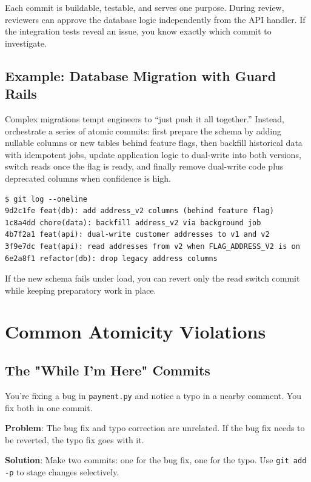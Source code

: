 Each commit is buildable, testable, and serves one purpose. During review, reviewers can approve the database logic independently from the API handler. If the integration tests reveal an issue, you know exactly which commit to investigate.

\subsection{Example: Database Migration with Guard Rails}
Complex migrations tempt engineers to ``just push it all together.'' Instead, orchestrate a series of atomic commits: first prepare the schema by adding nullable columns or new tables behind feature flags, then backfill historical data with idempotent jobs, update application logic to dual-write into both versions, switch reads once the flag is ready, and finally remove dual-write code plus deprecated columns when confidence is high.

\begin{lstlisting}[style=shell,caption={Sequencing migration commits}]
$ git log --oneline
9d2c1fe feat(db): add address_v2 columns (behind feature flag)
1c8a4dd chore(data): backfill address_v2 via background job
4b7f2a1 feat(api): dual-write customer addresses to v1 and v2
3f9e7dc feat(api): read addresses from v2 when FLAG_ADDRESS_V2 is on
6e2a8f1 refactor(db): drop legacy address columns
\end{lstlisting}

If the new schema fails under load, you can revert only the read switch commit while keeping preparatory work in place.

\section{Common Atomicity Violations}

\subsection{The "While I'm Here" Commits}
You're fixing a bug in \texttt{payment.py} and notice a typo in a nearby comment. You fix both in one commit.

\begin{warningbox}
\textbf{Problem}: The bug fix and typo correction are unrelated. If the bug fix needs to be reverted, the typo fix goes with it.

\textbf{Solution}: Make two commits: one for the bug fix, one for the typo. Use \texttt{git add -p} to stage changes selectively.
\end{warningbox}

